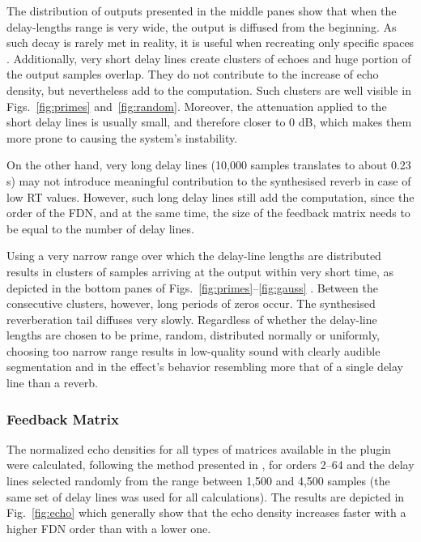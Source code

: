 \documentclass[twoside,a4paper]{article}
\begin{document}
The distribution of outputs presented in the middle panes show that when the delay-lengths range is very wide, the output is diffused from the beginning. As such decay is rarely met in reality, it is useful when recreating only specific spaces \cite{Oksanen13}. Additionally, very short delay lines create clusters of echoes and huge portion of the output samples overlap. They do not contribute to the increase of echo density, but nevertheless add to the computation. Such clusters are well visible in Figs.~\ref{fig:primes} and~\ref{fig:random}. Moreover, the attenuation applied to the short delay lines is usually small, and therefore closer to 0 dB, which makes them more prone to causing the system's instability.

On the other hand, very long delay lines (10,000 samples translates to about 0.23\,s) may not introduce meaningful contribution to the synthesised reverb in case of low RT values. However, such long delay lines still add the computation, since the order of the FDN, and at the same time, the size of the feedback matrix needs to be equal to the number of delay lines.

Using a very narrow range over which the delay-line lengths are distributed results in clusters of samples arriving at the output within very short time, as depicted in the bottom panes of Figs.~\ref{fig:primes}--\ref{fig:gauss} . Between the consecutive clusters, however, long periods of zeros occur. The synthesised reverberation tail diffuses very slowly. Regardless of whether the delay-line lengths are chosen to be prime, random, distributed normally or uniformly, choosing too narrow range results in low-quality sound with clearly audible segmentation and in the effect's behavior resembling more that of a single delay line than a reverb. 




\subsubsection{Feedback Matrix}\label{subsubsec:feedbackMatrix}

The normalized echo densities for all types of matrices available in the plugin were calculated, following the method presented in \cite{abel:2006, huang:2007, huang:2008}, for orders 2--64 and the delay lines selected randomly from the range between 1,500 and 4,500 samples (the same set of delay lines was used for all calculations). The results are depicted in Fig.~\ref{fig:echo} which generally show that the echo density increases faster with a higher FDN order than with a lower one. 
\end{document}
